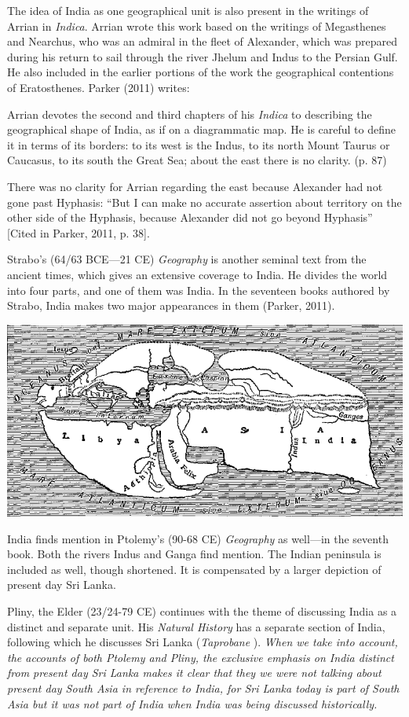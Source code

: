 The idea of India as one geographical unit is also present in the writings of Arrian in \textit{Indica}. Arrian wrote this work based on the writings of Megasthenes and Nearchus, who was an admiral in the fleet of Alexander, which was prepared during his return to sail through the river Jhelum and Indus to the Persian Gulf. He also included in the earlier portions of the work the geographical contentions of Eratosthenes. Parker (2011) writes: 

Arrian devotes the second and third chapters of his \textit{Indica} to describing the geographical shape of India, as if on a diagrammatic map. He is careful to define it in terms of its borders: to its west is the Indus, to its north Mount Taurus or Caucasus, to its south the Great Sea; about the east there is no clarity. (p. 87) 

There was no clarity for Arrian regarding the east because Alexander had not gone past Hyphasis: “But I can make no accurate assertion about territory on the other side of the Hyphasis, because Alexander did not go beyond Hyphasis” [Cited in Parker, 2011, p. 38]. 

Strabo’s (64/63 BCE—21 CE) \textit{Geography} is another seminal text from the ancient times, which gives an extensive coverage to India. He divides the world into four parts, and one of them was India. In the seventeen books authored by Strabo, India makes two major appearances in them (Parker, 2011).

\includegraphics{figures/appendix-a-fig1.png}

India finds mention in Ptolemy’s (90-68 CE) \textit{Geography} as well—in the seventh book. Both the rivers Indus and Ganga find mention. The Indian peninsula is included as well, though shortened. It is compensated by a larger depiction of present day Sri Lanka.

Pliny, the Elder (23/24-79 CE) continues with the theme of discussing India as a distinct and separate unit. His \textit{Natural History} has a separate section of India, following which he discusses Sri Lanka (\textit{Taprobane} ). \textit{When we take into account, the accounts of both Ptolemy and Pliny, the exclusive emphasis on India distinct from present day Sri Lanka makes it clear that they we were not talking about present day South Asia in reference to India, for Sri Lanka today is part of South Asia but it was not part of India when India was being discussed historically.} 


